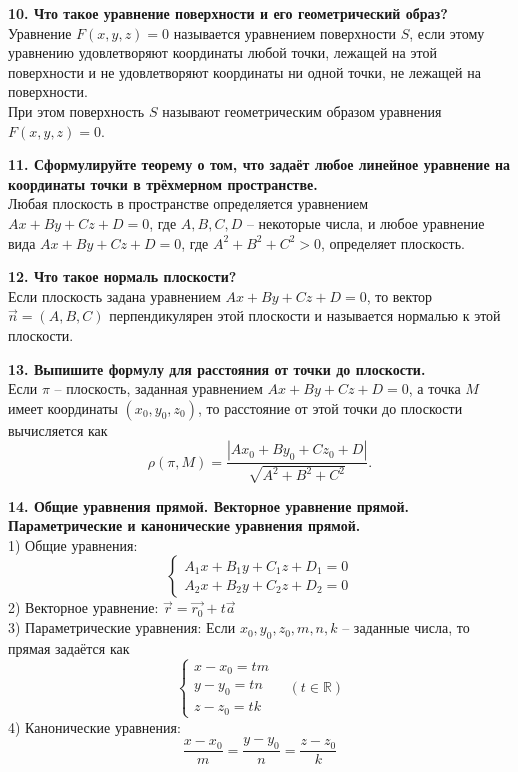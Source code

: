 \documentclass[11pt,a4paper]{article}
\newcommand{\R}{\mathbb{R}}
\newcommand{\vect}[1]{\overrightarrow{#1}}
\begin{document}
\textbf{10. Что такое уравнение поверхности и его геометрический образ?\\}
Уравнение $F(x, y, z) = 0$ называется уравнением поверхности $S$, если этому уравнению удовлетворяют координаты любой точки, лежащей на этой поверхности и не удовлетворяют координаты ни одной точки, не лежащей на поверхности.\\
При этом поверхность $S$ называют геометрическим образом уравнения $F(x, y, z) = 0$.

\textbf{11. Сформулируйте теорему о том, что задаёт любое линейное уравнение на координаты точки в трёхмерном пространстве.\\}
Любая плоскость в пространстве определяется уравнением $Ax + By + Cz + D = 0$, где $A, B, C, D$ -- некоторые числа, и любое уравнение вида $Ax + By + Cz + D = 0$, где $A^2 + B^2 + C^2 > 0$, определяет плоскость.
\pagebreak

\textbf{12. Что такое нормаль плоскости?\\}
Если плоскость задана уравнением $Ax + By + Cz + D = 0$, то вектор $\vect{n} = (A, B, C)$ перпендикулярен этой плоскости и называется нормалью к этой плоскости.

\textbf{13. Выпишите формулу для расстояния от точки до плоскости.\\}
Если $\pi$ -- плоскость, заданная уравнением $Ax + By + Cz + D = 0$, а точка $M$ имеет координаты $(x_0, y_0, z_0)$, то расстояние от этой точки до плоскости вычисляется как
$$\rho ( \pi, M ) = \frac{ \left\vert A x_0 + B y_0 + C z_0 + D \right\vert }{\sqrt{A^2 + B^2 + C^2}}.$$

\textbf{14. Общие уравнения прямой. Векторное уравнение прямой. Параметрические и канонические уравнения прямой.\\}
1) Общие уравнения:
$$\begin{cases}
A_1 x + B_1 y+ C_1 z + D_1 = 0 \\
A_2 x + B_2 y+ C_2 z + D_2 = 0
\end{cases}$$
2) Векторное уравнение: $\vect{r} = \vect{r_0} + t \vect{a}$\\
3) Параметрические уравнения:
Если $x_0, y_0, z_0, m, n, k$ -- заданные числа, то прямая задаётся как
$$\begin{cases}
x - x_0 = tm \\
y - y_0 = tn \\
z - z_0 = tk
\end{cases} \quad (t \in \R)$$
4) Канонические уравнения:
$$\frac{x - x_0}{m} = \frac{y - y_0}{n} = \frac{z - z_0}{k}$$
\end{document}
